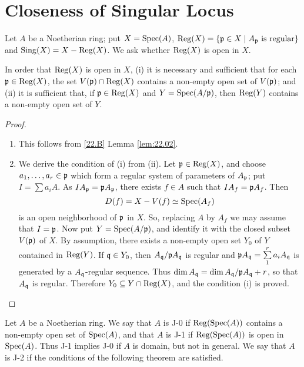 \documentclass[../main]{subfiles}
\begin{document}
\section{Closeness of Singular Locus}\label{sec:32}

\newparagraph Let $A$ be a Noetherian ring; put $X = \operatorname{Spec}(A)$, $\operatorname{Reg}(X) = \{\mathfrak{p} \in X \mid A_{\mathfrak{p}} \text { is regular}\}$ and $\operatorname{Sing}(X) = X - \operatorname{Reg}(X)$. We ask whether $\operatorname{Reg}(X)$ is open in $X$. 

\begin{lemma}
\label{lem:32.1}
In order that $\operatorname{Reg}(X)$ is open in $X$, (i) it is necessary and sufficient that for each $\mathfrak{p} \in \operatorname{Reg}(X)$, the set $V(\mathfrak{p}) \cap \operatorname{Reg}(X)$ contains a non-empty open set of $V(\mathfrak{p})$; and (ii) it is sufficient that, if $\mathfrak{p} \in \operatorname{Reg}(X)$ and $Y = \operatorname{Spec}(A/\mathfrak{p})$, then $\operatorname{Reg}(Y)$ contains a non-empty open set of $Y$. 
\end{lemma}

\begin{proof}
\begin{enumerate}
    \item This follows from \ref{22.B} Lemma \ref{lem:22.02}. 
    \item We derive the condition of (i) from (ii). Let $\mathfrak{p} \in \operatorname{Reg}(X)$, and choose $a_1, \dots, a_r \in \mathfrak{p}$ which form a regular system of parameters of $A_{\mathfrak{p}}$; put $I = \sum a_i A$. As $I A_{\mathfrak{p}} = \mathfrak{p} A_{\mathfrak{p}}$, there exists $f \in A$ such that $I A_f = \mathfrak{p} A_f$. Then \[D(f) = X - V(f) \simeq \operatorname{Spec}(A_f)\] is an open neighborhood of $\mathfrak{p}$ in $X$. So, replacing $A$ by $A_f$ we may assume that $I = \mathfrak{p}$. Now put $Y = \operatorname{Spec}(A/\mathfrak{p})$, and identify it with the closed subset $V(\mathfrak{p})$ of $X$. By assumption, there exists a non-empty open set $Y_0$ of $Y$ contained in $\operatorname{Reg}(Y)$. If $\mathfrak{q} \in Y_0$, then $A_{\mathfrak{q}}/\mathfrak{p} A_{\mathfrak{q}}$ is regular and $\mathfrak{p} A_{\mathfrak{q}} = \sum\limits_1^r a_i A_{\mathfrak{q}}$ is generated by a $A_{\mathfrak{q}}$-regular sequence. Thus $\operatorname{dim} A_{\mathfrak{q}} = \operatorname{dim} A_{\mathfrak{q}}/\mathfrak{p} A_{\mathfrak{q}} + r$, so that $A_{\mathfrak{q}}$ is regular. Therefore $Y_0 \subseteq Y \cap \operatorname{Reg}(X)$, and the condition (i) is proved. 
\end{enumerate}
\end{proof}

\newparagraph Let $A$ be a Noetherian ring. We say that $A$ is J-0 if $\operatorname{Reg}(\operatorname{Spec}(A))$ contains a non-empty open set of $\operatorname{Spec}(A)$, and that $A$ is J-1 if $\operatorname{Reg}(\operatorname{Spec}(A))$ is open in $\operatorname{Spec}(A)$. Thus J-1 implies J-0 if $A$ is domain, but not in general. We say that $A$ is J-2 if the conditions of the following theorem are satisfied.
\end{document}
